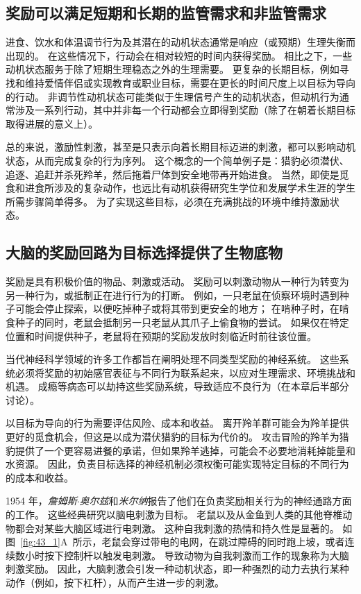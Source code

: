 \subsection{奖励可以满足短期和长期的监管需求和非监管需求}

进食、饮水和体温调节行为及其潜在的动机状态通常是响应（或预期）生理失衡而出现的。
在这些情况下，行动会在相对较短的时间内获得奖励。
相比之下，一些动机状态服务于除了短期生理稳态之外的生理需要。
更复杂的长期目标，例如寻找和维持爱情伴侣或实现教育或职业目标，需要在更长的时间尺度上以目标为导向的行动。
非调节性动机状态可能类似于生理信号产生的动机状态，但动机行为通常涉及一系列行动，其中并非每一个行动都会立即得到奖励（除了在朝着长期目标取得进展的意义上）。


总的来说，激励性刺激，甚至是只表示向着长期目标迈进的刺激，都可以影响动机状态，从而完成复杂的行为序列。
这个概念的一个简单例子是：猎豹必须潜伏、追逐、追赶并杀死羚羊，然后拖着尸体到安全地带再开始进食。
当然，即使是觅食和进食所涉及的复杂动作，也远比有动机获得研究生学位和发展学术生涯的学生所需步骤简单得多。
为了实现这些目标，必须在充满挑战的环境中维持激励状态。



\subsection{大脑的奖励回路为目标选择提供了生物底物}

奖励是具有积极价值的物品、刺激或活动。
奖励可以刺激动物从一种行为转变为另一种行为，或抵制正在进行行为的打断。
例如，一只老鼠在侦察环境时遇到种子可能会停止探索，以便吃掉种子或将其带到更安全的地方；
在啃种子时，在啃食种子的同时，老鼠会抵制另一只老鼠从其爪子上偷食物的尝试。
如果仅在特定位置和时间提供种子，老鼠将在预期的奖励发放时刻临近时前往该位置。


当代神经科学领域的许多工作都旨在阐明处理不同类型奖励的神经系统。
这些系统必须将奖励的初始感官表征与不同行为联系起来，以应对生理需求、环境挑战和机遇。
成瘾等病态可以劫持这些奖励系统，导致适应不良行为（在本章后半部分讨论）。


以目标为导向的行为需要评估风险、成本和收益。
离开羚羊群可能会为羚羊提供更好的觅食机会，但这是以成为潜伏猎豹的目标为代价的。
攻击冒险的羚羊为猎豹提供了一个更容易进餐的承诺，但如果羚羊逃掉，可能会不必要地消耗掉能量和水资源。
因此，负责目标选择的神经机制必须权衡可能实现特定目标的不同行为的成本和收益。


1954 年，\textit{詹姆斯$\cdot$奥尔兹}和\textit{米尔纳}报告了他们在负责奖励相关行为的神经通路方面的工作。
这些经典研究以脑电刺激为目标。
老鼠以及从金鱼到人类的其他脊椎动物都会对某些大脑区域进行电刺激。
这种自我刺激的热情和持久性是显著的。
如图~\ref{fig:43_1}A~所示，老鼠会穿过带电的电网，在跳过障碍的同时跑上坡，或者连续数小时按下控制杆以触发电刺激。
导致动物为自我刺激而工作的现象称为大脑刺激奖励。
因此，大脑刺激会引发一种动机状态，即一种强烈的动力去执行某种动作（例如，按下杠杆），从而产生进一步的刺激。



